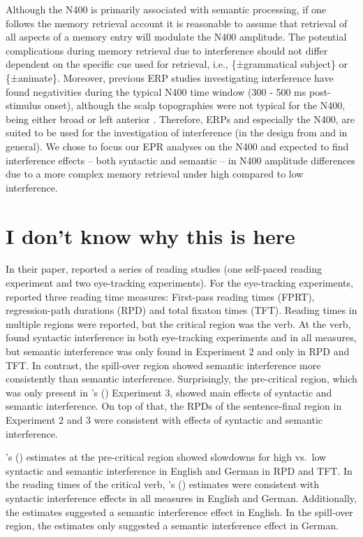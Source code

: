 \documentclass[a4paper, man, floatsintext]{apa7}
\begin{document}
Although the N400 is primarily associated with semantic processing, if one follows the memory retrieval account it is reasonable to assume that retrieval of all aspects of a memory entry will modulate the N400 amplitude. The potential complications during memory retrieval due to interference should not differ dependent on the specific cue used for retrieval, i.e., \{±grammatical subject\} or \{±animate\}.  Moreover, previous ERP studies investigating interference have found negativities during the typical N400 time window (300 - 500 ms post-stimulus onset), although the scalp topographies were not typical for the N400, being either broad \citep{schoknecht2022} or left anterior \citep{vasishth_drenhaus_2011}. Therefore, ERPs and especially the N400, are suited to be used for the investigation of interference (in the design from \citet{vandyke07} and in general).  We chose to focus our EPR analyses on the N400 and expected to find interference effects -- both syntactic and semantic -- in N400 amplitude differences due to a more complex memory retrieval under high compared to low interference. 



\section{I don't know why this is here}
In their \citeyear{vandyke07} paper, \citeauthor{vandyke07} reported a series of reading studies (one self-paced reading experiment and two eye-tracking experiments). For the eye-tracking experiments, \citet{vandyke07} reported three reading time measures: First-pass reading times (FPRT), regression-path durations (RPD) and total fixaton times (TFT). Reading times in multiple regions were reported, but the critical region was the verb. At the verb, \citet{vandyke07} found syntactic interference in both eye-tracking experiments and in all measures, but semantic interference was only found in Experiment 2 and only in RPD and TFT. In contrast, the spill-over region showed semantic interference more consistently than semantic interference. Surprisingly, the pre-critical region, which was only present in \citeauthor{vandyke07}'s (\citeyear{vandyke07}) Experiment 3, showed main effects of syntactic and semantic interference. On top of that, the RPDs of the sentence-final region in Experiment 2 and 3 were consistent with effects of syntactic and  semantic interference.

\citeauthor{mertzen}'s (\citeyear{mertzen}) estimates at the pre-critical region showed slowdowns for high vs.\ low  syntactic and semantic interference in English and German in RPD and TFT. In the reading times of the critical verb, \citeauthor{mertzen}'s (\citeyear{mertzen}) estimates were consistent with syntactic interference effects in all measures in English and German. Additionally, the estimates suggested a semantic interference effect in English. In the spill-over region, the estimates only suggested a semantic interference effect in German.
\end{document}
